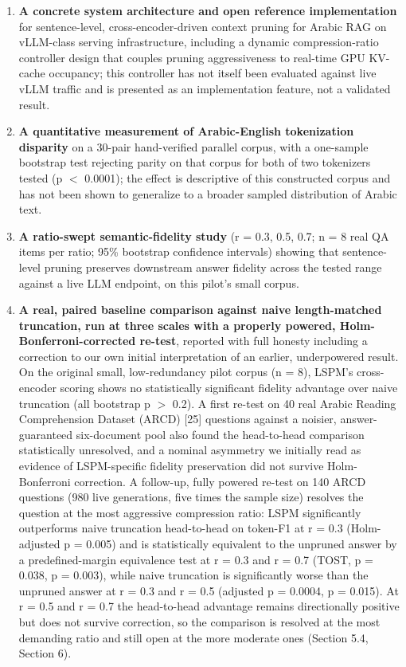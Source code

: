 \begin{enumerate}
\item \textbf{A concrete system architecture and open reference implementation} for sentence-level, cross-encoder-driven context pruning for Arabic RAG on vLLM-class serving infrastructure, including a dynamic compression-ratio controller design that couples pruning aggressiveness to real-time GPU KV-cache occupancy; this controller has not itself been evaluated against live vLLM traffic and is presented as an implementation feature, not a validated result.
\item \textbf{A quantitative measurement of Arabic-English tokenization disparity} on a 30-pair hand-verified parallel corpus, with a one-sample bootstrap test rejecting parity on that corpus for both of two tokenizers tested (p $<$ 0.0001); the effect is descriptive of this constructed corpus and has not been shown to generalize to a broader sampled distribution of Arabic text.
\item \textbf{A ratio-swept semantic-fidelity study} (r = 0.3, 0.5, 0.7; n = 8 real QA items per ratio; 95\% bootstrap confidence intervals) showing that sentence-level pruning preserves downstream answer fidelity across the tested range against a live LLM endpoint, on this pilot's small corpus.
\item \textbf{A real, paired baseline comparison against naive length-matched truncation, run at three scales with a properly powered, Holm-Bonferroni-corrected re-test}, reported with full honesty including a correction to our own initial interpretation of an earlier, underpowered result. On the original small, low-redundancy pilot corpus (n = 8), LSPM's cross-encoder scoring shows no statistically significant fidelity advantage over naive truncation (all bootstrap p $>$ 0.2). A first re-test on 40 real Arabic Reading Comprehension Dataset (ARCD) [25] questions against a noisier, answer-guaranteed six-document pool also found the head-to-head comparison statistically unresolved, and a nominal asymmetry we initially read as evidence of LSPM-specific fidelity preservation did not survive Holm-Bonferroni correction. A follow-up, fully powered re-test on 140 ARCD questions (980 live generations, five times the sample size) resolves the question at the most aggressive compression ratio: LSPM significantly outperforms naive truncation head-to-head on token-F1 at r = 0.3 (Holm-adjusted p = 0.005) and is statistically equivalent to the unpruned answer by a predefined-margin equivalence test at r = 0.3 and r = 0.7 (TOST, p = 0.038, p = 0.003), while naive truncation is significantly worse than the unpruned answer at r = 0.3 and r = 0.5 (adjusted p = 0.0004, p = 0.015). At r = 0.5 and r = 0.7 the head-to-head advantage remains directionally positive but does not survive correction, so the comparison is resolved at the most demanding ratio and still open at the more moderate ones (Section 5.4, Section 6).

\end{enumerate}
